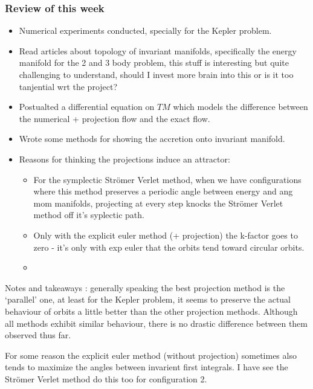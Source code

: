 \documentclass[12pt]{article}
\begin{document}
\subsubsection{Review of this week}
\begin{itemize}
    \item Numerical experiments conducted, specially for the Kepler problem.
    \item Read articles about topology of invariant manifolds, specifically the energy manifold for the 2 and 3 body problem, this stuff is interesting but quite challenging to understand, should I invest more brain into this or is it too tanjential wrt the project?
    \item Postualted a differential equation on $TM$ which models the difference between the numerical + projection flow and the exact flow. 
    \item Wrote some methods for showing the accretion onto invariant manifold.
    \item Reasons for thinking the projections induce an attractor:
    \begin{itemize}
        \item For the symplectic Str\"omer Verlet method, when we have configurations where this method preserves a periodic angle between energy and ang mom manifolds, projecting at every step knocks the Str\"omer Verlet method off it's syplectic path.
        \item Only with the explicit euler method (+ projection) the k-factor goes to zero - it's only with exp euler that the orbits tend toward circular orbits.
        \item 
    \end{itemize}
\end{itemize}

Notes and takeaways : generally speaking the best projection method is the `parallel' one, at least for the Kepler problem, it seems to preserve the actual behaviour of orbits a little better than the other projection methods. Although all methods exhibit similar behaviour, there is no drastic difference between them observed thus far. 

For some reason the explicit euler method (without projection) sometimes also tends to maximize the angles between invarient first integrals. I have see the Str\"omer Verlet method do this too for configuration 2.
\end{document}

